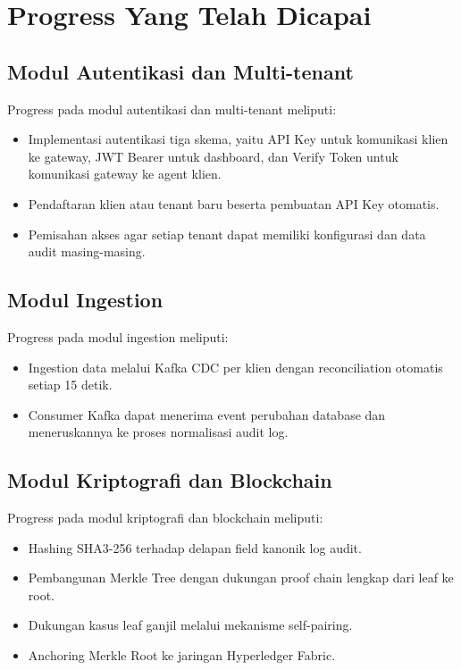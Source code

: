 \chapter{Progress Yang Telah Dicapai}

\section{Modul Autentikasi dan Multi-tenant}

Progress pada modul autentikasi dan multi-tenant meliputi:

\begin{itemize}
    \item Implementasi autentikasi tiga skema, yaitu API Key untuk komunikasi klien ke gateway, JWT Bearer untuk dashboard, dan Verify Token untuk komunikasi gateway ke agent klien.
    \item Pendaftaran klien atau tenant baru beserta pembuatan API Key otomatis.
    \item Pemisahan akses agar setiap tenant dapat memiliki konfigurasi dan data audit masing-masing.
\end{itemize}

\section{Modul Ingestion}

Progress pada modul ingestion meliputi:

\begin{itemize}
    \item Ingestion data melalui Kafka CDC per klien dengan reconciliation otomatis setiap 15 detik.
    \item Consumer Kafka dapat menerima event perubahan database dan meneruskannya ke proses normalisasi audit log.
\end{itemize}

\section{Modul Kriptografi dan Blockchain}

Progress pada modul kriptografi dan blockchain meliputi:

\begin{itemize}
    \item Hashing SHA3-256 terhadap delapan field kanonik log audit.
    \item Pembangunan Merkle Tree dengan dukungan proof chain lengkap dari leaf ke root.
    \item Dukungan kasus leaf ganjil melalui mekanisme self-pairing.
    \item Anchoring Merkle Root ke jaringan Hyperledger Fabric.
\end{itemize}

